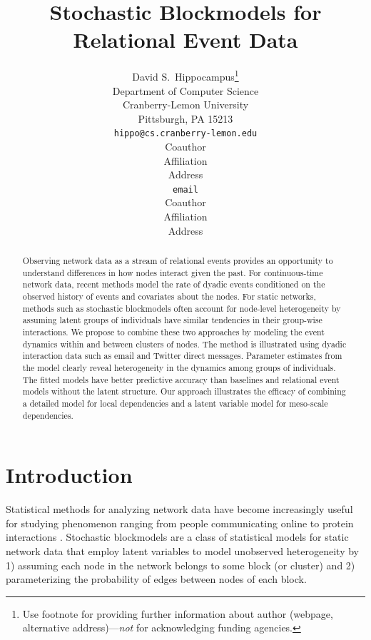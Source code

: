 \documentclass{article}
\title{Stochastic Blockmodels for Relational Event Data}
\author{
David S.~Hippocampus\thanks{ Use footnote for providing further information
about author (webpage, alternative address)---\emph{not} for acknowledging
funding agencies.} \\
Department of Computer Science\\
Cranberry-Lemon University\\
Pittsburgh, PA 15213 \\
\texttt{hippo@cs.cranberry-lemon.edu} \\
\And
Coauthor \\
Affiliation \\
Address \\
\texttt{email} \\
\AND
Coauthor \\
Affiliation \\
Address \\
}
\begin{document}
 

\maketitle

\savenotes

\begin{abstract}
Observing network data as a stream of relational events provides an opportunity to understand differences in how nodes interact given the past.  For continuous-time network data, recent methods model the rate of dyadic events conditioned on the observed history of events and covariates about the nodes.  For static networks, methods such as stochastic blockmodels often account for node-level heterogeneity by assuming latent groups of individuals have similar tendencies in their group-wise interactions.  We propose to combine these two approaches by modeling the event dynamics within and between clusters of nodes.  The method is illustrated using dyadic interaction data such as email and Twitter direct messages.  Parameter estimates from the model clearly reveal heterogeneity in the dynamics among groups of individuals.  The fitted models have better predictive accuracy than baselines and relational event models without the latent structure.  Our approach illustrates the efficacy of combining a detailed model for local dependencies and a latent variable model for meso-scale dependencies.
\end{abstract}

\section{Introduction}

Statistical methods for analyzing network data have become increasingly useful for studying  phenomenon ranging from people communicating online to protein interactions \cite{Goldenberg2009}.  Stochastic blockmodels \cite{Nowicki2001, Kemp, Ishiguro2010} are a class of statistical models for static network data that employ latent variables to model unobserved heterogeneity by 1) assuming each node in the network belongs to some block (or cluster) and 2) parameterizing the probability of edges between nodes of each block.  %
\end{document}
